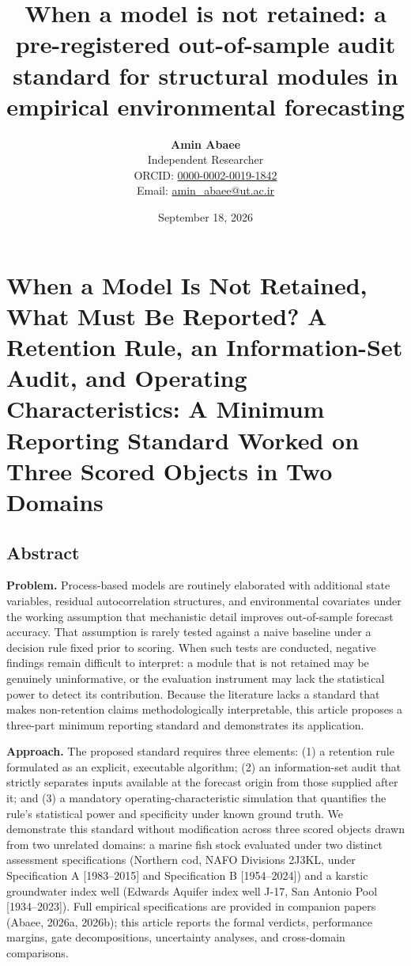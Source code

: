 \documentclass[11pt]{article}
\title{When a model is not retained: a pre-registered out-of-sample audit standard for structural modules in empirical environmental forecasting}
\author{\textbf{Amin Abaee}\\ Independent Researcher\\[2pt] ORCID: \href{https://orcid.org/0000-0002-0019-1842}{0000-0002-0019-1842}\\ Email: \href{mailto:amin_abaee@ut.ac.ir}{amin_abaee@ut.ac.ir}}
\date{September 18, 2026}
\begin{document}
\maketitle

\section{When a Model Is Not Retained, What Must Be Reported? A
Retention Rule, an Information-Set Audit, and Operating Characteristics:
A Minimum Reporting Standard Worked on Three Scored Objects in Two
Domains}\label{when-a-model-is-not-retained-what-must-be-reported-a-retention-rule-an-information-set-audit-and-operating-characteristics-a-minimum-reporting-standard-worked-on-three-scored-objects-in-two-domains}

\subsection{Abstract}\label{abstract}

\textbf{Problem.} Process-based models are routinely elaborated with
additional state variables, residual autocorrelation structures, and
environmental covariates under the working assumption that mechanistic
detail improves out-of-sample forecast accuracy. That assumption is
rarely tested against a naive baseline under a decision rule fixed prior
to scoring. When such tests are conducted, negative findings remain
difficult to interpret: a module that is not retained may be genuinely
uninformative, or the evaluation instrument may lack the statistical
power to detect its contribution. Because the literature lacks a
standard that makes non-retention claims methodologically interpretable,
this article proposes a three-part minimum reporting standard and
demonstrates its application.

\textbf{Approach.} The proposed standard requires three elements: (1) a
retention rule formulated as an explicit, executable algorithm; (2) an
information-set audit that strictly separates inputs available at the
forecast origin from those supplied after it; and (3) a mandatory
operating-characteristic simulation that quantifies the rule's
statistical power and specificity under known ground truth. We
demonstrate this standard without modification across three scored
objects drawn from two unrelated domains: a marine fish stock evaluated
under two distinct assessment specifications (Northern cod, NAFO
Divisions 2J3KL, under Specification A {[}1983--2015{]} and
Specification B {[}1954--2024{]}) and a karstic groundwater index well
(Edwards Aquifer index well J-17, San Antonio Pool {[}1934--2023{]}).
Full empirical specifications are provided in companion papers (Abaee,
2026a, 2026b); this article reports the formal verdicts, performance
margins, gate decompositions, uncertainty analyses, and cross-domain
comparisons.
\end{document}
